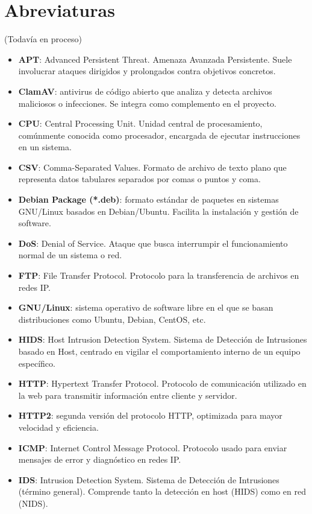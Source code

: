 \documentclass[12pt,a4paper]{report}
\begin{document}
\chapter*{Abreviaturas}
(Todavía en proceso)
\begin{itemize}
	\item \textbf{APT}: Advanced Persistent Threat. Amenaza Avanzada Persistente. Suele involucrar ataques dirigidos y prolongados contra objetivos concretos.
	\item \textbf{ClamAV}: antivirus de código abierto que analiza y detecta archivos maliciosos o infecciones. Se integra como complemento en el proyecto.
	\item \textbf{CPU}: Central Processing Unit. Unidad central de procesamiento, comúnmente conocida como procesador, encargada de ejecutar instrucciones en un sistema.
	\item \textbf{CSV}: Comma-Separated Values. Formato de archivo de texto plano que representa datos tabulares separados por comas o puntos y coma.
	\item \textbf{Debian Package (*.deb)}: formato estándar de paquetes en sistemas GNU/Linux basados en Debian/Ubuntu. Facilita la instalación y gestión de software.
	\item \textbf{DoS}: Denial of Service. Ataque que busca interrumpir el funcionamiento normal de un sistema o red.
	\item \textbf{FTP}: File Transfer Protocol. Protocolo para la transferencia de archivos en redes IP.
	\item \textbf{GNU/Linux}: sistema operativo de software libre en el que se basan distribuciones como Ubuntu, Debian, CentOS, etc.
	\item \textbf{HIDS}: Host Intrusion Detection System. Sistema de Detección de Intrusiones basado en Host, centrado en vigilar el comportamiento interno de un equipo específico.
	\item \textbf{HTTP}: Hypertext Transfer Protocol. Protocolo de comunicación utilizado en la web para transmitir información entre cliente y servidor.
	\item \textbf{HTTP2}: segunda versión del protocolo HTTP, optimizada para mayor velocidad y eficiencia.
	\item \textbf{ICMP}: Internet Control Message Protocol. Protocolo usado para enviar mensajes de error y diagnóstico en redes IP.
	\item \textbf{IDS}: Intrusion Detection System. Sistema de Detección de Intrusiones (término general). Comprende tanto la detección en host (HIDS) como en red (NIDS).

\end{itemize}
\end{document}
